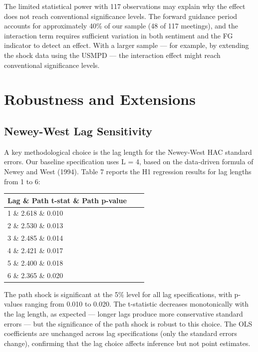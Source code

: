 The limited statistical power with 117 observations may explain why the effect does not reach conventional significance levels. The forward guidance period accounts for approximately 40\% of our sample (48 of 117 meetings), and the interaction term requires sufficient variation in both sentiment and the FG indicator to detect an effect. With a larger sample --- for example, by extending the shock data using the USMPD --- the interaction effect might reach conventional significance levels.


\section{Robustness and Extensions}

\subsection{Newey-West Lag Sensitivity}

A key methodological choice is the lag length for the Newey-West HAC standard errors. Our baseline specification uses L = 4, based on the data-driven formula of Newey and West (1994). Table 7 reports the H1 regression results for lag lengths from 1 to 6:

\begin{table}[htbp]
\centering
\begin{tabular}{lcc}
\toprule
Lag \& Path t-stat \& Path p-value \\
\midrule
1 \& 2.618 \& 0.010 \\
2 \& 2.530 \& 0.013 \\
3 \& 2.485 \& 0.014 \\
4 \& 2.421 \& 0.017 \\
5 \& 2.400 \& 0.018 \\
6 \& 2.365 \& 0.020 \\
\bottomrule
\end{tabular}
\end{table}

The path shock is significant at the 5\% level for all lag specifications, with p-values ranging from 0.010 to 0.020. The t-statistic decreases monotonically with the lag length, as expected --- longer lags produce more conservative standard errors --- but the significance of the path shock is robust to this choice. The OLS coefficients are unchanged across lag specifications (only the standard errors change), confirming that the lag choice affects inference but not point estimates.

